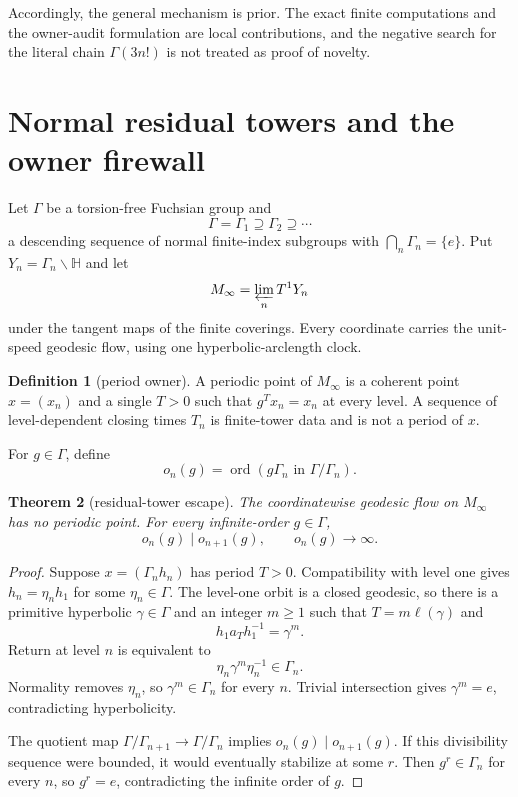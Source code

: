 \documentclass[11pt]{article}
\newtheorem{theorem}{Theorem}[section]
\theoremstyle{definition}
\newtheorem{definition}[theorem]{Definition}
\theoremstyle{remark}
\newcommand{\HH}{\mathbb H}
\newcommand{\ord}{\operatorname{ord}}
\begin{document}
Accordingly, the general mechanism is prior. The exact finite computations and the owner-audit formulation are local contributions, and the negative search for the literal chain $\Gamma(3n!)$ is not treated as proof of novelty.

\section{Normal residual towers and the owner firewall}

Let $\Gamma$ be a torsion-free Fuchsian group and
\[
\Gamma=\Gamma_1\supseteq\Gamma_2\supseteq\cdots
\]
a descending sequence of normal finite-index subgroups with
$\bigcap_n\Gamma_n=\{e\}$. Put $Y_n=\Gamma_n\backslash\HH$ and let
\[
M_\infty=\varprojlim_n T^1Y_n
\]
under the tangent maps of the finite coverings. Every coordinate carries the unit-speed geodesic flow, using one hyperbolic-arclength clock.

\begin{definition}[period owner]
A periodic point of $M_\infty$ is a coherent point $x=(x_n)$ and a single $T>0$ such that $g^T x_n=x_n$ at every level. A sequence of level-dependent closing times $T_n$ is finite-tower data and is not a period of $x$.
\end{definition}

For $g\in\Gamma$, define
\[
o_n(g)=\ord(g\Gamma_n\text{ in }\Gamma/\Gamma_n).
\]

\begin{theorem}[residual-tower escape]\label{thm:residual}
The coordinatewise geodesic flow on $M_\infty$ has no periodic point. For every infinite-order $g\in\Gamma$,
\[
o_n(g)\mid o_{n+1}(g),
\qquad
o_n(g)\longrightarrow\infty.
\]
\end{theorem}

\begin{proof}
Suppose $x=(\Gamma_nh_n)$ has period $T>0$. Compatibility with level one gives $h_n=\eta_nh_1$ for some $\eta_n\in\Gamma$. The level-one orbit is a closed geodesic, so there is a primitive hyperbolic $\gamma\in\Gamma$ and an integer $m\geq1$ such that $T=m\ell(\gamma)$ and
\[
h_1a_Th_1^{-1}=\gamma^m.
\]
Return at level $n$ is equivalent to
\[
\eta_n\gamma^m\eta_n^{-1}\in\Gamma_n.
\]
Normality removes $\eta_n$, so $\gamma^m\in\Gamma_n$ for every $n$. Trivial intersection gives $\gamma^m=e$, contradicting hyperbolicity.

The quotient map $\Gamma/\Gamma_{n+1}\to\Gamma/\Gamma_n$ implies $o_n(g)\mid o_{n+1}(g)$. If this divisibility sequence were bounded, it would eventually stabilize at some $r$. Then $g^r\in\Gamma_n$ for every $n$, so $g^r=e$, contradicting the infinite order of $g$.
\end{proof}
\end{document}
